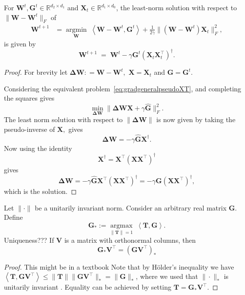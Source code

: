 \documentclass[11pt]{article}
\newcommand{\mat}[1]{\bm{#1}}
\newcommand{\dotprod}[1]{\left< #1\right>}
\DeclareMathOperator{\argmininn}{argmin}
\DeclareMathOperator{\argmaxinn}{argmax}
\newcommand{\argmin}[1]{ \underset{#1}{\argmininn} \;}
\newcommand{\argmax}[1]{ \underset{#1}{\argmaxinn}\;}
\newcommand{\mG}{\mat{ G}}
\newcommand{\mX}{\mat{ X}}
\newcommand{\mW}{\mat{ W}}
\newcommand{\DW}{\mat{ \Delta W}}
\newcommand{\mT}{\mat{ T}}
\newcommand{\mV}{\mat{ V}}
\newcommand{\R}{\mathbb{R}}
\newcommand{\David}[1]{{\color{blue}{\textbf{David:}} #1}}
\begin{document}
\begin{lemma} For $\mW^t,\mG^t \in \R^{d_2 \times d_1}$ and $\mX_t\in\R^{d_1 \times d_0}$, 
the least-norm solution with respect to $\|\mW-\mW^t\|_F$ of 
\begin{align}
    \mW^{t+1} &=  \argmin{\mW} \dotprod{\mW- \mW^t, \mG^t } + \frac{1}{2\gamma}\|(\mW - \mW^t)\mX_t\|_F^2,\label{eq:gradgeneralpseudoF}
\end{align}
is given by
\begin{equation}
     \mW^{t+1} \; =  \;\mW^t -\gamma \mG^t (\mX_t\mX_t^\top)^\dagger. \label{eq:gradgeneralpseudoF-sol}
\end{equation}
\end{lemma}
\begin{proof}
For brevity let $\DW : = \mW- \mW^t,$ $\mX = \mX_t$ and $\mG = \mG^t.$

Considering the equivalent problem~\eqref{eq:gradgeneralpseudoXT}, and completing the squares gives
\begin{equation}
    \min_{\DW} \| \DW \mX + \gamma \hat{\mG}\|_F^2.
\end{equation}
The least norm solution with respect to $\|\DW\|$ is now given by taking the pseudo-inverse of $\mX,$ gives 
\[\DW = - \gamma \hat{\mG}\mX^\dagger. \]
Now using the identity $$ \mX^\dagger = \mX^\top(\mX\mX^\top)^{\dagger} $$
gives
\[\DW = - \gamma \hat{\mG}\mX^\top(\mX\mX^\top)^{\dagger} = - \gamma  \mG (\mX\mX^\top)^{\dagger}, \]which is the solution.
\end{proof}

\begin{lemma}\label{lemma:rotationsdual}
    Let $\|\cdot\|$ be a unitarily invariant norm. Consider an arbitrary real matrix  $\bm{G}$. Define
    \begin{equation*}
        \bm{G}_* :=\argmax{\|\mT\| = 1}\dotprod{\mT,\mG}.
    \end{equation*}
    \David{Uniqueness???}
    If $\bm{V}$ is a matrix with orthonormal columns, then
    \begin{equation*}
        \bm{G}_* \mV^{\top} = (\bm{G} \mV^{\top})_*
    \end{equation*}
\end{lemma}
\begin{proof}
    \David{This might be in a textbook} Note that by Hölder's inequality \cite[Exercise IV.2.12]{bhatia} we have $\dotprod{\mT,\mG\mV^{\top}} \leq \|\mT\| \|\mG\mV^{\top}\|_* = \|\mG\|_*$, where we used that $\|\cdot\|_*$ is unitarily invariant \cite[p.96]{bhatia}. Equality can be achieved by setting $\mT = \mG_* \mV^{\top}$. 
\end{proof}
\end{document}
